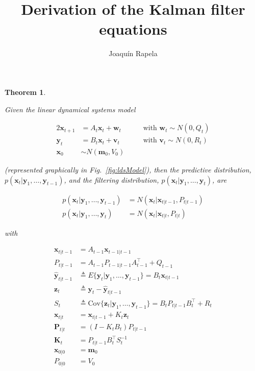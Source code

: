 \documentclass[12pt]{article}
\title{Derivation of the Kalman filter equations}
\author{Joaquín Rapela}
\newtheorem{theorem}{Theorem}
\begin{document}
\maketitle

\begin{theorem}
	\label{thm:kalmanFilterEqs}

    Given the linear dynamical systems model

    \begin{alignat*}{2}
        \mathbf{x}_{t+1}&=A_t\mathbf{x}_t+\mathbf{w}_t&\quad&\text{with }\mathbf{w}_t\sim N(0,Q_t)\\
        \mathbf{y}_t&=B_t\mathbf{x}_t+\mathbf{v}_t&&\text{with }\mathbf{v}_t\sim N(0,R_t)\\
        \mathbf{x}_0&\sim N(\mathbf{m}_0,V_0)&&
    \end{alignat*}

    \noindent (represented graphically in Fig.~\ref{fig:ldsModel}), then the predictive
    distribution, $p(\mathbf{x}_t|\mathbf{y}_1,\ldots,\mathbf{y}_{t-1})$, and
    the filtering distribution,
    $p(\mathbf{x}_t|\mathbf{y}_1,\ldots,\mathbf{y}_t)$, are

    \begin{align*}
        p(\mathbf{x}_t|\mathbf{y}_1,\ldots,\mathbf{y}_{t-1})&=N(\mathbf{x}_t|\mathbf{x}_{t|t-1},P_{t|t-1})\\
        p(\mathbf{x}_t|\mathbf{y}_1,\ldots,\mathbf{y}_t)&=N(\mathbf{x}_t|\mathbf{x}_{t|t},P_{t|t})
    \end{align*}

    \noindent with

    \begin{align}
        \mathbf{x}_{t|t-1}&=A_{t-1}\mathbf{x}_{t-1|t-1}\label{eq:xtGtm1}\\
        P_{t|t-1}&=A_{t-1}P_{t-1|t-1}A_{t-1}^\intercal+Q_{t-1}\label{eq:PtGtm1}\\
        \hat{\mathbf{y}}_{t|t-1}&\triangleq E\{\mathbf{y}_t|\mathbf{y}_1,\ldots,\mathbf{y}_{t-1}\}=B_t\mathbf{x}_{t|t-1}\label{eq:ytGtm1}\\
        \mathbf{z}_t&\triangleq\mathbf{y}_t-\hat{\mathbf{y}}_{t|t-1}\nonumber\\
        S_t&\triangleq \text{Cov}\{\mathbf{z}_t|\mathbf{y}_1,\ldots,\mathbf{y}_{t-1}\}=B_tP_{t|t-1}B_t^\intercal+R_t\label{eq:St}\\
        \mathbf{x}_{t|t}&=\mathbf{x}_{t|t-1}+K_t\mathbf{z}_t\label{eq:xtGt}\\
        \mathbf{P}_{t|t}&=(I-K_tB_t)P_{t|t-1}\label{eq:PtGt}\\
        \mathbf{K}_t&=P_{t|t-1}B_t^\intercal S_t^{-1}\label{eq:Kt}\\
        \mathbf{x}_{0|0}&=\mathbf{m}_0\label{eq:x0G0}\\
        P_{0|0}&=V_0\label{eq:P0G0}
    \end{align}
\end{theorem}
\end{document}
